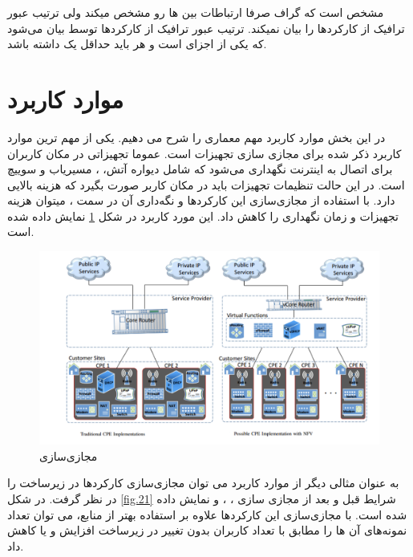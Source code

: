 مشخص است که گراف  صرفا ارتباطات بین ‌ها رو مشخص میکند ولی ترتیب عبور ترافیک از کارکردها را بیان نمیکند.
ترتیب عبور ترافیک از کارکردها توسط  بیان می‌شود که یکی از اجزای  است و هر  باید حداقل یک  داشته باشد.

\section{موارد کاربرد}
در این بخش موارد کاربرد مهم معماری  را شرح می دهیم.
یکی از مهم ترین موارد کاربرد ذکر شده برای  مجازی سازی تجهیزات  است.
عموما تجهیزاتی در مکان کاربران برای اتصال به اینترنت نگهداری می‌شود که شامل دیواره آتش، ، مسیریاب و سوییچ است.
در این حالت تنظیمات تجهیزات باید در مکان کاربر صورت بگیرد که هزینه بالایی دارد.
با استفاده از مجازی‌سازی این کارکردها و نگه‌داری آن در سمت ، میتوان هزینه تجهیزات و زمان نگهداری را کاهش داد.
این مورد کاربرد در شکل \ref{fig.20} نمایش داده شده است.

\begin{figure}[h!]
\center\includegraphics[scale=.5]{images/cpe}
\caption{مجازی‌سازی }
\label{fig.20}
\end{figure}

به عنوان مثالی دیگر از موارد کاربرد می توان مجازی‌سازی کارکردها در زیرساخت  را در نظر گرفت.
در شکل \ref{fig.21} شرایط قبل و بعد از مجازی سازی
، ،  و 
نمایش داده شده است.
با مجازی‌سازی این کارکردها علاوه بر استفاده بهتر از منابع، می توان تعداد نمونه‌های آن ها را مطابق با تعداد کاربران بدون تغییر در زیرساخت افزایش و یا کاهش داد.

